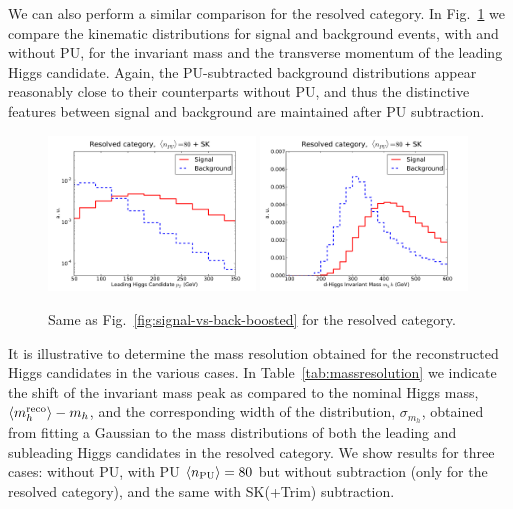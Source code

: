 We can also perform a similar comparison for
the resolved category.
%
In Fig.~\ref{fig:signal-vs-back-resolved} we compare
the kinematic distributions for signal and background events,
with and without PU, for the invariant mass and the
transverse momentum of the leading
     Higgs candidate.
     Again, the PU-subtracted background distributions
     appear reasonably close
     to their counterparts without PU, and thus
     the distinctive features between signal and background
     are maintained after PU subtraction.

\begin{figure}[t]
  \begin{center}
      \includegraphics[width=0.49\textwidth]{plots/pt_h0_res_comp_back.pdf}
   \includegraphics[width=0.49\textwidth]{plots/m_h0_res_comp_back.pdf}
     \caption{\small
       Same as Fig.~\ref{fig:signal-vs-back-boosted} for the resolved category.
}
\label{fig:signal-vs-back-resolved}
\end{center}
\end{figure}

It is illustrative to determine
the mass resolution obtained for the
reconstructed Higgs candidates in the various cases.
%
In Table~\ref{tab:massresolution}
we indicate the shift of the invariant mass peak as compared
to the nominal Higgs mass, $\left\langle m_h^{\rm reco}\right\rangle-m_h$,
and the corresponding width of the distribution, $\sigma_{m_h}$,
obtained from fitting a Gaussian to the mass distributions
of both the leading and subleading Higgs candidates in
the resolved category.
        We show results for three cases: without PU, with PU $\left\langle n_{\rm PU}\right\rangle=80$
        but without subtraction (only for the
        resolved category), and the same with SK(+Trim) subtraction.

